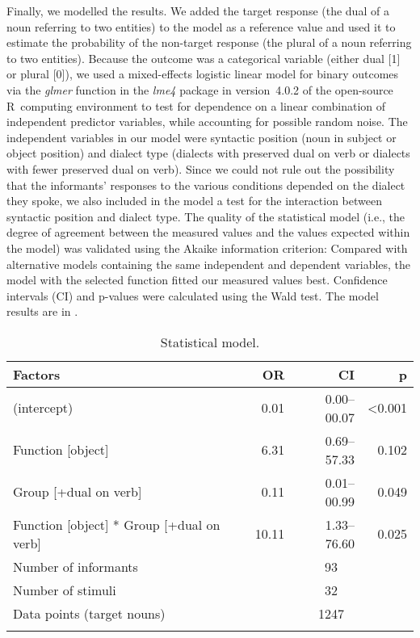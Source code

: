 \documentclass[output=paper,colorlinks,citecolor=brown]{langscibook}
\begin{document}
Finally, we modelled the results. We added the target response (the dual of a noun referring to two entities) to the model as a reference value and used it to estimate the probability of the non-target response (the plural of a noun referring to two entities). Because the outcome was a categorical variable (either dual [1] or plural [0]), we used a mixed-effects logistic linear model \citep{Jaeger2008,Winter2020} for binary outcomes via the \textit{glmer} function in the \textit{lme4} package in version~4.0.2 of the open-source R~computing environment \citep[][]{pav:rcore} to test for dependence on a linear combination of independent predictor variables, while accounting for possible random noise. The independent variables in our model were syntactic position (noun in subject or object position) and dialect type (dialects with preserved dual on verb or dialects with fewer preserved dual on verb). Since we could not rule out the possibility that the informants' responses to the various conditions depended on the dialect they spoke, we also included in the model a test for the interaction between syntactic position and dialect type. The quality of the statistical model (i.e., the degree of agreement between the measured values and the values expected within the model) was validated using the Akaike information criterion: Compared with alternative models containing the same independent and dependent variables, the model with the selected function fitted our measured values best. Confidence intervals (CI) and p-values were calculated using the Wald test. The model results are in .

\begin{table}
    \begin{tabular}{lrrr}
    \lsptoprule
Factors                                               & OR    & CI            & p     \\
\midrule
(intercept)                                           & 0.01  & 0.00--00.07   & <0.001\\
Function [object]                                     & 6.31  & 0.69--57.33   & 0.102 \\
Group [+dual on verb]                                 & 0.11  & 0.01--00.99   & 0.049 \\
Function [object] * Group [+dual on verb]             & 10.11 & 1.33--76.60   & 0.025 \\
\midrule
Number of informants                                            & \multicolumn{3}{c}{93}\\
Number of stimuli                                               & \multicolumn{3}{c}{32}\\
Data points (target nouns)                                      & \multicolumn{3}{c}{1247}\\
    \lspbottomrule
    \end{tabular}
    \caption{Statistical model.}
    \label{tab:pav:06}
\end{table}
\end{document}

